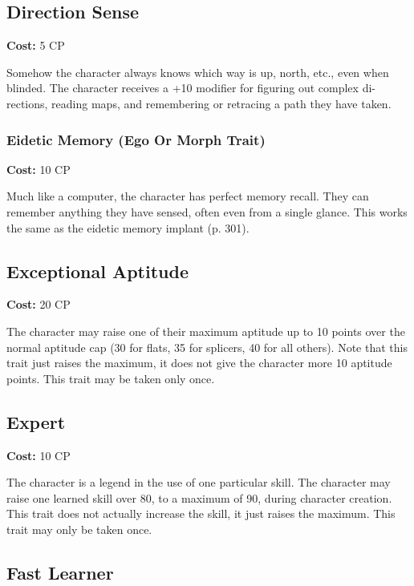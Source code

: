 \subsection{Direction Sense} \label{sec:traits-direction-sense} 

\textbf{Cost:} 5 CP 

Somehow the character always knows which way is up, north, etc., even when blinded. The character receives a +10 modifier for figuring out complex di- rections, reading maps, and remembering or retracing a path they have taken. 





\subsubsection{Eidetic Memory (Ego Or Morph Trait)} \label{sec:traits-eidetic-memory} \textbf{Cost:} 10 CP 

Much like a computer, the character has perfect memory recall. They can remember anything they have sensed, often even from a single glance. This works the same as the eidetic memory implant (p. 301). 

\subsection{Exceptional Aptitude} \label{sec:traits-exceptional-aptitude} 

\textbf{Cost:} 20 CP 

The character may raise one of their maximum aptitude up to 10 points over the normal aptitude cap (30 for flats, 35 for splicers, 40 for all others). Note that this trait just raises the maximum, it does not give the character more 10 aptitude points. This trait may be taken only once. 

\subsection{Expert} \label{sec:traits-expert} 

\textbf{Cost:} 10 CP 

The character is a legend in the use of one particular skill. The character may raise one learned skill over 80, to a maximum of 90, during character creation. This trait does not actually increase the skill, it just raises the maximum. This trait may only be taken once. 

\subsection{Fast Learner} \label{sec:traits-fast-learnier} 

